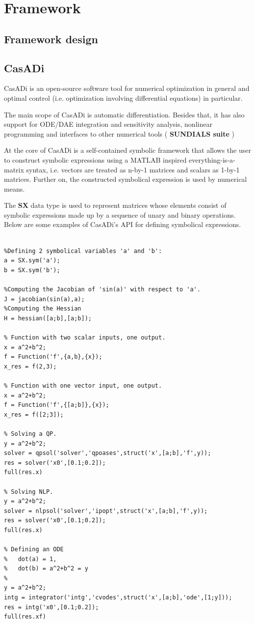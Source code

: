 \documentclass[12pt, letterpaper]{article}
\begin{document}
\section{Framework}
\label{label_framwork}

\subsection{Framework design}

\subsection{CasADi}
\label{CasADi_section}

CasADi is an open-source software tool for numerical optimization in general and optimal control (i.e. optimization involving differential equations) in particular. \cite{Andersson2018}

The main scope of CasADi is automatic differentiation. Besides that, it has also support for ODE/DAE integration and sensitivity analysis, nonlinear programming and interfaces to other numerical tools ( \textbf{SUNDIALS suite} )

At the core of CasADi is a self-contained symbolic framework that allows the user to construct symbolic expressions using a MATLAB inspired everything-is-a-matrix syntax, i.e. vectors are treated as n-by-1 matrices and scalars as 1-by-1 matrices. Further on, the constructed symbolical expression is used by numerical means.

The \textbf{SX} data type is used to represent matrices whose elements consist of symbolic expressions made up by a sequence of unary and binary operations.
Below are some examples of CasADi's  API for defining symbolical expressions.

\begin{lstlisting}

%Defining 2 symbolical variables 'a' and 'b':
a = SX.sym('a');
b = SX.sym('b');

%Computing the Jacobian of 'sin(a)' with respect to 'a'.
J = jacobian(sin(a),a);
%Computing the Hessian
H = hessian([a;b],[a;b]);

% Function with two scalar inputs, one output.
x = a^2+b^2;
f = Function('f',{a,b},{x});
x_res = f(2,3);

% Function with one vector input, one output.
x = a^2+b^2;
f = Function('f',{[a;b]},{x});
x_res = f([2;3]);

% Solving a QP.
y = a^2+b^2;
solver = qpsol('solver','qpoases',struct('x',[a;b],'f',y));
res = solver('x0',[0.1;0.2]);
full(res.x)

% Solving NLP.
y = a^2+b^2;
solver = nlpsol('solver','ipopt',struct('x',[a;b],'f',y));
res = solver('x0',[0.1;0.2]);
full(res.x)

% Defining an ODE
%   dot(a) = 1,
%   dot(b) = a^2+b^2 = y
%  
y = a^2+b^2;
intg = integrator('intg','cvodes',struct('x',[a;b],'ode',[1;y]));
res = intg('x0',[0.1;0.2]);
full(res.xf)

\end{lstlisting}
\end{document}
